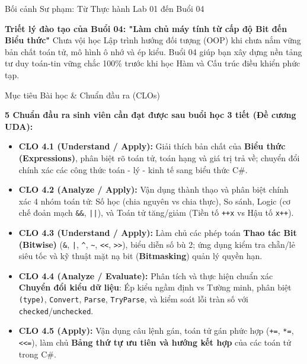 \documentclass[aspectratio=169, 10pt]{beamer}
\begin{document}
\begin{frame}{Bối cảnh Sư phạm: Từ Thực hành Lab 01 đến Buổi 04}
  \vspace{2mm}
  \begin{alertblock}{\textbf{Triết lý đào tạo của Buổi 04: "Làm chủ máy tính từ cấp độ Bit đến Biểu thức"}}
    Chưa vội học Lập trình hướng đối tượng (OOP) khi chưa nắm vững bản chất toán tử, mô hình ô nhớ và ép kiểu. Buổi 04 giúp bạn xây dựng nền tảng tư duy toán-tin vững chắc 100\% trước khi học Hàm và Cấu trúc điều khiển phức tạp.
  \end{alertblock}
\end{frame}

\begin{frame}{Mục tiêu Bài học \& Chuẩn đầu ra (CLOs)}
  \begin{block}{\textbf{5 Chuẩn đầu ra sinh viên cần đạt được sau buổi học 3 tiết (Đề cương UDA):}}
    \begin{itemize}\small
      \item \textbf{CLO 4.1 (Understand / Apply):} Giải thích bản chất của \textbf{Biểu thức (Expressions)}, phân biệt rõ toán tử, toán hạng và giá trị trả về; chuyển đổi chính xác các công thức toán - lý - kinh tế sang biểu thức C\#.
      \item \textbf{CLO 4.2 (Analyze / Apply):} Vận dụng thành thạo và phân biệt chính xác 4 nhóm toán tử: Số học (chia nguyên vs chia thực), So sánh, Logic (cơ chế đoản mạch \texttt{\&\&}, \texttt{||}), và Toán tử tăng/giảm (Tiền tố \texttt{++x} vs Hậu tố \texttt{x++}).
      \item \textbf{CLO 4.3 (Understand / Apply):} Làm chủ các phép toán \textbf{Thao tác Bit (Bitwise)} (\texttt{\&}, \texttt{|}, \texttt{\textasciicircum}, \texttt{\textasciitilde}, \texttt{<<}, \texttt{>>}), biểu diễn số bù 2; ứng dụng kiểm tra chẵn/lẻ siêu tốc và kỹ thuật mặt nạ bit (\textbf{Bitmasking}) quản lý quyền hạn.
      \item \textbf{CLO 4.4 (Analyze / Evaluate):} Phân tích và thực hiện chuẩn xác \textbf{Chuyển đổi kiểu dữ liệu}: Ép kiểu ngầm định vs Tường minh, phân biệt \texttt{(type)}, \texttt{Convert}, \texttt{Parse}, \texttt{TryParse}, và kiểm soát lỗi tràn số với \texttt{checked}/\texttt{unchecked}.
      \item \textbf{CLO 4.5 (Apply):} Vận dụng câu lệnh gán, toán tử gán phức hợp (\texttt{+=}, \texttt{*=}, \texttt{<<=}), làm chủ \textbf{Bảng thứ tự ưu tiên và hướng kết hợp} của các toán tử trong C\#.
    \end{itemize}
  \end{block}
\end{frame}
\end{document}
